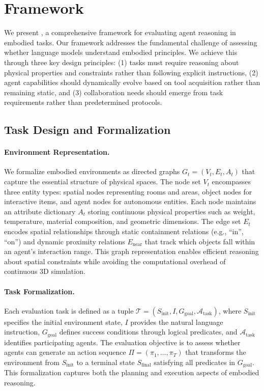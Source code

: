 \section{Framework}

We present \framework, a comprehensive framework for evaluating agent reasoning in embodied tasks. Our framework addresses the fundamental challenge of assessing whether language models understand embodied principles. We achieve this through three key design principles: (1) tasks must require reasoning about physical properties and constraints rather than following explicit instructions, (2) agent capabilities should dynamically evolve based on tool acquisition rather than remaining static, and (3) collaboration needs should emerge from task requirements rather than predetermined protocols.

\subsection{Task Design and Formalization}

\paragraph{Environment Representation.}
We formalize embodied environments as directed graphs $G_t = (V_t, E_t, A_t)$ that capture the essential structure of physical spaces. The node set $V_t$ encompasses three entity types: spatial nodes representing rooms and areas, object nodes for interactive items, and agent nodes for autonomous entities. Each node maintains an attribute dictionary $A_t$ storing continuous physical properties such as weight, temperature, material composition, and geometric dimensions. The edge set $E_t$ encodes spatial relationships through static containment relations (e.g., ``in'', ``on'') and dynamic proximity relations $E_{\text{near}}$ that track which objects fall within an agent's interaction range. This graph representation enables efficient reasoning about spatial constraints while avoiding the computational overhead of continuous 3D simulation.

\paragraph{Task Formalization.}
Each evaluation task is defined as a tuple $\mathcal{T} = (S_{\text{init}}, I, G_{\text{goal}}, \mathcal{A}_{\text{task}})$, where $S_{\text{init}}$ specifies the initial environment state, $I$ provides the natural language instruction, $G_{\text{goal}}$ defines success conditions through logical predicates, and $\mathcal{A}_{\text{task}}$ identifies participating agents. The evaluation objective is to assess whether agents can generate an action sequence $\Pi = (\pi_1, \ldots, \pi_T)$ that transforms the environment from $S_{\text{init}}$ to a terminal state $S_{\text{final}}$ satisfying all predicates in $G_{\text{goal}}$. This formalization captures both the planning and execution aspects of embodied reasoning.

